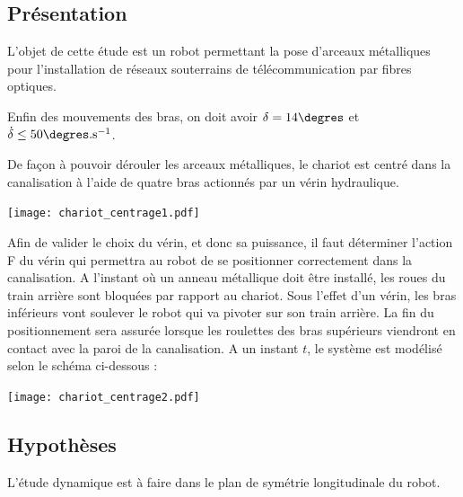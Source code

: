 \ifprof
\else
\begin{multicols}{2}
\fi

\subsection*{Présentation}

L'objet de cette étude est un robot permettant la pose d'arceaux métalliques pour l'installation de réseaux souterrains de télécommunication par fibres optiques.

\begin{obj}
Enfin des mouvements des bras, on doit avoir $\delta=14\degres$ et $\dot{\delta}\leq 50\degres.\text{s}^{-1}$.
\end{obj}
%

De façon à pouvoir dérouler les arceaux métalliques, le chariot est centré dans la canalisation à l'aide de quatre bras actionnés par un vérin hydraulique.

\begin{center}
\texttt{[image: chariot\_centrage1.pdf]}
\end{center}


Afin de valider le choix du vérin, et donc sa puissance, il faut déterminer l'action F du vérin
qui permettra au robot de se positionner correctement dans la canalisation.
A l'instant où un anneau métallique doit
être installé, les roues du train arrière sont
bloquées par rapport au chariot. Sous l'effet
d'un vérin, les bras inférieurs vont soulever le
robot qui va pivoter sur son train arrière. La fin
du positionnement sera assurée lorsque les
roulettes des bras supérieurs viendront en
contact avec la paroi de la canalisation.
A un instant $t$, le système est modélisé selon le schéma ci-dessous :


\begin{center}
\texttt{[image: chariot\_centrage2.pdf]}
\end{center}


\subsection*{Hypothèses}
L'étude dynamique est à faire dans le plan de symétrie longitudinale du robot.


\end{multicols}
